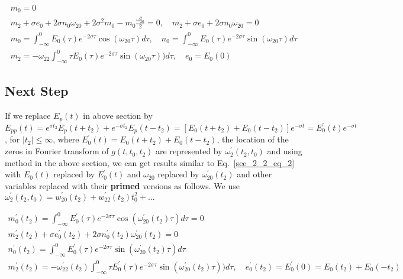 \documentclass[11pt]{elsarticle}
\begin{document}
\begin{eqnarray*}\label{sec_2_2_eq_2}   
m_{0} = 0 \\
m_2 + \sigma e_0  +2 \sigma n_0  \omega_{20}   + 2 \sigma^{2} m_0 - m_0 \frac{\omega_{20}^2}{2} = 0, \quad m_2 + \sigma e_0  +2 \sigma n_0  \omega_{20} = 0 \\
m_0 =  \int_{-\infty}^{0}    E_0(\tau)e^{-2 \sigma \tau}  \cos{ (\omega_{20} \tau)} d\tau, \quad n_0 =  \int_{-\infty}^{0}    E_0(\tau)e^{-2 \sigma \tau}  \sin{ (\omega_{20} \tau)} d\tau \\
m_2 = - \omega_{22} \int_{-\infty}^{0}  \tau  E_0(\tau)e^{-2 \sigma \tau}  \sin{ (\omega_{20} \tau)}) d\tau , \quad e_0 = E_0(0)
\end{eqnarray*}
\begin{equation} \end{equation}

\subsection{\label{sec:Section_2_3} \textbf{Next Step } \protect\\  \lowercase{} }



If we replace $E_p(t)$ in above section by $E_{pp}(t)= e^{\sigma t_2} E_p(t+t_2) + e^{-\sigma t_2} E_p(t-t_2)= [E_0(t+t_2) + E_0(t-t_2) ] e^{-\sigma t}= E_{0}^{'}(t) e^{-\sigma t}$, for $|t_2| \leq \infty$, where $E_{0}^{'}(t)  = E_0(t+t_2) + E_0(t-t_2) $, the location of the zeros in Fourier transform of $g(t, t_0, t_2)$ are represented by $\omega_{2}^{'}(t_2, t_0)$  and using method in the above section, we can get results similar to Eq.~\ref{sec_2_2_eq_2} with $E_0(t)$ replaced by  $E_{0}^{'}(t)$ and $\omega_{20}$ replaced by $\omega_{20}^{'}(t_2)$ and other variables replaced with their \textbf{primed} versions as follows. We use $\omega_2^{'}(t_2, t_0) = w_{20}^{'}(t_2) + w_{22}^{'}(t_2) t_0^{2} +...$


\begin{eqnarray*}\label{sec_2_2_eq_3}   
m_{0}^{'}(t_2) = \int_{-\infty}^{0}    E_0^{'}(\tau)e^{-2 \sigma \tau}  \cos{ (\omega_{20}^{'}(t_2) \tau)} d\tau = 0 \\
m_2^{'}(t_2) + \sigma e_0^{'}(t_2)  + 2 \sigma n_0^{'}(t_2)  \omega_{20}^{'}(t_2) = 0 \\
n_0^{'}(t_2) =  \int_{-\infty}^{0}    E_0^{'}(\tau)e^{-2 \sigma \tau}  \sin{ (\omega_{20}^{'}(t_2) \tau)} d\tau \\
m_2^{'}(t_2) = - \omega_{22}^{'}(t_2) \int_{-\infty}^{0}  \tau  E_0^{'}(\tau)e^{-2 \sigma \tau}  \sin{ (\omega_{20}^{'}(t_2) \tau)}) d\tau , \quad e_0^{'}(t_2) = E_0^{'}(0) = E_0(t_2) + E_0(-t_2) 
\end{eqnarray*}
\begin{equation} \end{equation}
\end{document}
